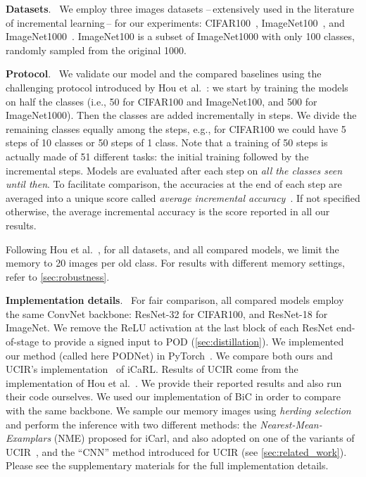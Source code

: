 \documentclass[runningheads]{llncs}
\newcommand{\parag}[1]{\vspace{0.2cm}\noindent\textbf{#1}.\ }
\begin{document}
\parag{Datasets} We employ three images datasets --\,extensively used in the literature of incremental learning\,-- for our experiments: CIFAR100~\cite{krizhevskycifar100}, ImageNet100~\cite{deng2009imagenet,hou2019ucir,wu2019bias_correction}, and ImageNet1000~\cite{deng2009imagenet}.
ImageNet100 is a subset of ImageNet1000 with only 100 classes, randomly sampled from the original 1000.



\parag{Protocol} We validate our model and the compared baselines using the challenging protocol introduced by Hou et al.~\cite{hou2019ucir}: we start by training the models on half the classes (i.e., 50 for CIFAR100 and ImageNet100, and 500 for ImageNet1000). Then the classes are added incrementally in steps. We divide the remaining classes equally among the steps, e.g., for CIFAR100 we could have 5 steps of 10 classes or 50 steps of 1 class. Note that a training of 50 steps is actually made of 51 different tasks: the initial training followed by the incremental steps. Models are evaluated after each step on \textit{all the classes seen until then}. To facilitate comparison, the accuracies at the end of each step are averaged into a unique score called \textit{average incremental accuracy}~\cite{rebuffi2017icarl}. If not specified otherwise, the average incremental accuracy is the score reported in all our results.



Following Hou et al.~\cite{hou2019ucir}, for all datasets, and all compared models, we limit the memory  to 20 images per old class. For results with different memory settings, refer to \autoref{sec:robustness}.

\parag{Implementation details} For fair comparison, all compared models employ the same ConvNet backbone: ResNet-32 for CIFAR100, and ResNet-18 for ImageNet. We remove the ReLU activation at the last block of each ResNet end-of-stage to provide a signed input to POD (\autoref{sec:distillation}). We implemented our method (called here PODNet) in PyTorch~\cite{paszke2017pytorch}. 
We compare both ours and UCIR's implementation~\cite{hou2019ucir} of iCaRL. Results of UCIR come from the implementation of Hou et al.~\cite{hou2019ucir}. We provide their reported results and also run their code ourselves. We used our implementation of BiC in order to compare with the same backbone.
We sample our memory images using \textit{herding selection}~\cite{rebuffi2017icarl} and perform the inference with two different methods: the \textit{Nearest-Mean-Examplars} (NME) proposed for iCarl, and also adopted on one of the variants of UCIR~\cite{hou2019ucir}, and the ``CNN'' method introduced for UCIR (see \autoref{sec:related_work}).
Please see the supplementary materials for the full implementation details.
\end{document}
